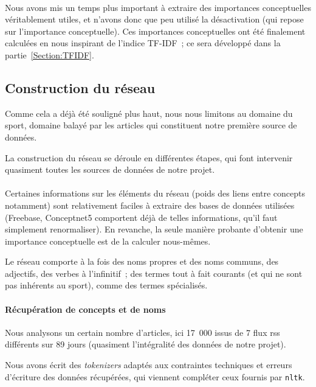 \documentclass[a4paper, 12pt]{article}
\newcommand{\pyt}[1]{\texttt{#1}}%
\newcommand{\ang}[1]{\textit{#1}}%
\begin{document}
\paragraph{}
Nous avons mis un temps plus important à extraire des importances conceptuelles véritablement utiles, et n'avons donc que peu utilisé la désactivation (qui repose sur l'importance conceptuelle). Ces importances conceptuelles ont été finalement calculées en nous inspirant de l'indice TF-IDF~; ce sera développé dans la partie~\ref{Section:TFIDF}.



\subsection{Construction du réseau}
Comme cela a déjà été souligné plus haut, nous nous limitons au domaine du sport, domaine balayé par les articles qui constituent notre première source de données. 

La construction du réseau se déroule en différentes étapes, qui font intervenir quasiment toutes les sources de données de notre projet.


\paragraph{}
Certaines informations sur les éléments du réseau (poids des liens entre concepts notamment) sont relativement faciles à extraire des bases de données utilisées (Freebase, Conceptnet5 comportent déjà de telles informations, qu'il faut simplement renormaliser). En revanche, la seule manière probante d'obtenir une importance conceptuelle est de la calculer nous-mêmes.

Le réseau comporte à la fois des noms propres et des noms communs, des adjectifs, des verbes à l'infinitif~; des termes tout à fait courants (et qui ne sont pas inhérents au sport), comme des termes spécialisés.



\paragraph{Récupération de concepts et de noms}

Nous analysons un certain nombre d'articles, ici 17~000 issus de 7 flux rss différents sur 89 jours (quasiment l'intégralité des données de notre projet).


Nous avons écrit des \ang{tokenizers} adaptés aux contraintes techniques et erreurs d'écriture des données récupérées, qui viennent compléter ceux fournis par \pyt{nltk}.
\end{document}
